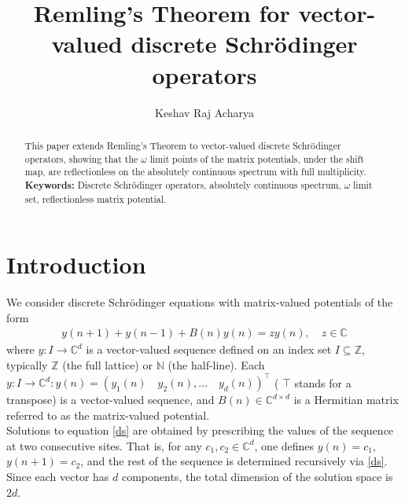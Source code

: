 \documentclass[reqno]{amsart}
\numberwithin{equation}{section}
\newcommand{\C}{\mathbb{C}}
\begin{document}
	
\title{ Remling's Theorem for vector-valued discrete Schr\"odinger operators } 
 \author[Acharya]{Keshav Raj Acharya}

\address{Department of Mathematics\\
Embry-Riddle Aeronautical University\\  
1 Aerospace Blvd., Daytona Beach, FL 32114, U.S.A. \\ E-mail address:acharyak@erau.edu }


\begin{abstract} This paper extends Remling's Theorem to vector-valued discrete Schr\"odinger operators, showing that the $\omega$ limit points of the matrix potentials, under the shift map, are reflectionless on the absolutely continuous spectrum with full multiplicity.\\

\noindent \textbf{ Keywords:} {Discrete Schr\"odinger operators, absolutely continuous spectrum, $\omega$ limit set, reflectionless matrix potential}.  


\end{abstract}
\maketitle




\section{Introduction} 
 
 

We consider discrete Schr\"odinger equations with matrix-valued potentials of the form
\begin{align}\label{ds}
y(n+1)+y(n-1)+B(n)y(n)=zy(n),\quad z\in \C 
\end{align}
where \( y : I \to \mathbb{C}^d \) is a vector-valued sequence defined on an index set \( I \subseteq \mathbb{Z} \), typically \( \mathbb{Z} \) (the full lattice) or \( \mathbb{N} \) (the half-line). Each $ y: I \rightarrow \C^d: y(n) =(y_1(n)\quad y_2(n), \hdots\quad y_d(n))^{ \top } $ ( $ \top $ stands for a transpose)  is a vector-valued sequence, and \( B(n) \in \mathbb{C}^{d \times d} \) is a Hermitian matrix referred to as the matrix-valued potential.\\
Solutions to equation \eqref{ds} are obtained by prescribing the values of the sequence at two consecutive sites. That is, for any \( c_1, c_2 \in \mathbb{C}^d \), one defines \( y(n) = c_1 \), \( y(n+1) = c_2 \), and the rest of the sequence is determined recursively via \eqref{ds}. Since each vector has \( d \) components, the total dimension of the solution space is \( 2d \).
\end{document}
